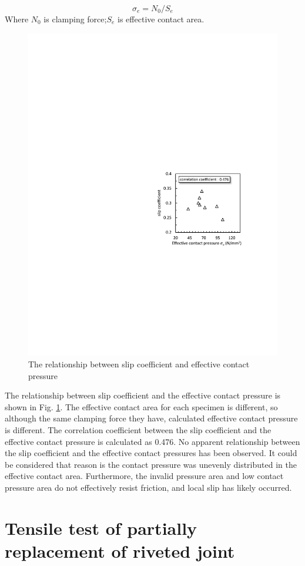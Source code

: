\begin{equation}
    σ_e=N_0/S_e
\end{equation}
Where $N_0$ is clamping force;$ S_e$ is effective contact area. 

\begin{figure}[htbp]
    \centering
    \includegraphics[width=0.65\linewidth]{imgs/ch3/fig14.pdf}
    \caption{The relationship between slip coefficient and effective contact pressure}
    \label{ch3fig14}  
\end{figure}

The relationship between slip coefficient and the effective contact pressure is shown in Fig. \ref{ch3fig14}. The effective contact area for each specimen is different, so although the same clamping force they have, calculated effective contact pressure is different. The correlation coefficient between the slip coefficient and the effective contact pressure is calculated as 0.476. No apparent relationship between the slip coefficient and the effective contact pressures has been observed. It could be considered that reason is the contact pressure was unevenly distributed in the effective contact area. Furthermore, the invalid pressure area and low contact pressure area do not effectively resist friction, and local slip has likely occurred. 




\section{Tensile test of partially replacement of riveted joint}


